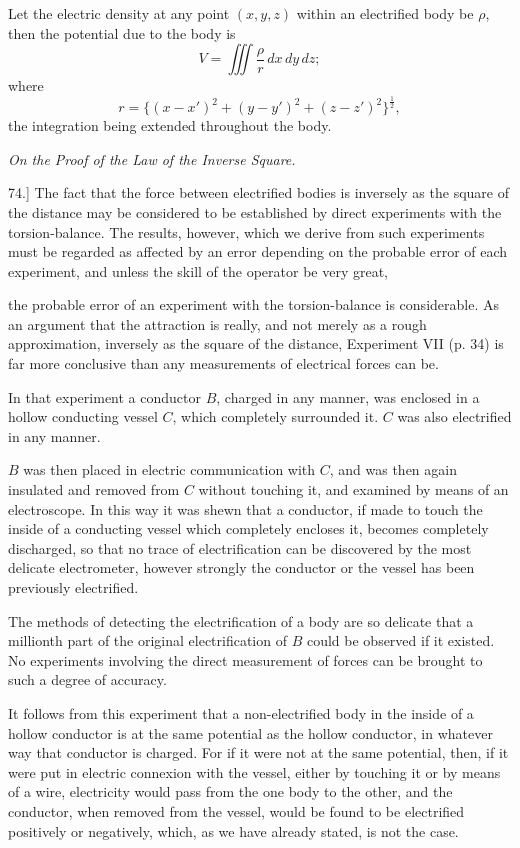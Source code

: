 \documentclass[11pt,a4paper]{article}
\begin{document}
Let the electric density at any point \((x,y,z)\) within an electrified
body be \(\rho\), then the potential due to the body is
\[
V=\iiint\frac{\rho}{r}\,dx\,dy\,dz;
\]
where
\[
r=\{(x-x')^2+(y-y')^2+(z-z')^2\}^{\frac{1}{2}},
\]
the integration being extended throughout the body.

\begin{center}
\textit{On the Proof of the Law of the Inverse Square.}
\end{center}

74.] The fact that the force between electrified bodies is inversely as
the square of the distance may be considered to be established by direct
experiments with the torsion-balance. The results, however, which we
derive from such experiments must be regarded as affected by an error
depending on the probable error of each experiment, and unless the skill
of the operator be very great,

\clearpage
\setcounter{footnote}{0}

the probable error of an experiment with the torsion-balance is
considerable. As an argument that the attraction is really, and not
merely as a rough approximation, inversely as the square of the distance,
Experiment VII (p. 34) is far more conclusive than any measurements of
electrical forces can be.

In that experiment a conductor \(B\), charged in any manner, was enclosed
in a hollow conducting vessel \(C\), which completely surrounded it.
\(C\) was also electrified in any manner.

\(B\) was then placed in electric communication with \(C\), and was then
again insulated and removed from \(C\) without touching it, and examined
by means of an electroscope. In this way it was shewn that a conductor,
if made to touch the inside of a conducting vessel which completely
encloses it, becomes completely discharged, so that no trace of
electrification can be discovered by the most delicate electrometer,
however strongly the conductor or the vessel has been previously
electrified.

The methods of detecting the electrification of a body are so delicate
that a millionth part of the original electrification of \(B\) could be
observed if it existed. No experiments involving the direct measurement
of forces can be brought to such a degree of accuracy.

It follows from this experiment that a non-electrified body in the inside
of a hollow conductor is at the same potential as the hollow conductor,
in whatever way that conductor is charged. For if it were not at the
same potential, then, if it were put in electric connexion with the
vessel, either by touching it or by means of a wire, electricity would
pass from the one body to the other, and the conductor, when removed
from the vessel, would be found to be electrified positively or
negatively, which, as we have already stated, is not the case.
\end{document}
